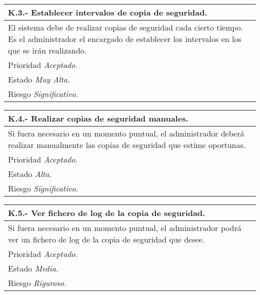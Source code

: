 \documentclass[a4paper,oneside,11pt]{book}
\begin{document}
\begin{center}
\begin{tabulary}{15cm}{|L|}
	\hline
		\bf{K.3.- Establecer intervalos de copia de seguridad.} \\
	\hline
		El sistema debe de realizar copias de seguridad cada cierto tiempo. Es el administrador el encargado de establecer los intervalos en los que se irán realizando. \\
	\hline
		Prioridad \textit{Aceptado.} \\
	\hline
		Estado \textit{Muy Alta.} \\
	\hline
		Riesgo \textit{Significativo.} \\
	\hline
\end{tabulary}
\end{center}

\begin{center}
\begin{tabulary}{15cm}{|L|}
	\hline
		\bf{K.4.- Realizar copias de seguridad manuales.} \\
	\hline
		Si fuera necesario en un momento puntual, el administrador deberá realizar manualmente las copias de seguridad que estime oportunas. \\
	\hline
		Prioridad \textit{Aceptado.} \\
	\hline
		Estado \textit{Alta.} \\
	\hline
		Riesgo \textit{Significativo.} \\
	\hline
\end{tabulary}
\end{center}

\begin{center}
\begin{tabulary}{15cm}{|L|}
	\hline
		\bf{K.5.- Ver fichero de log de la copia de seguridad.} \\
	\hline
		Si fuera necesario en un momento puntual, el administrador podrá ver un fichero de log de la copia de seguridad que desee. \\
	\hline
		Prioridad \textit{Aceptado.} \\
	\hline
		Estado \textit{Media.} \\
	\hline
		Riesgo \textit{Riguroso.} \\
	\hline
\end{tabulary}
\end{center}
\end{document}
